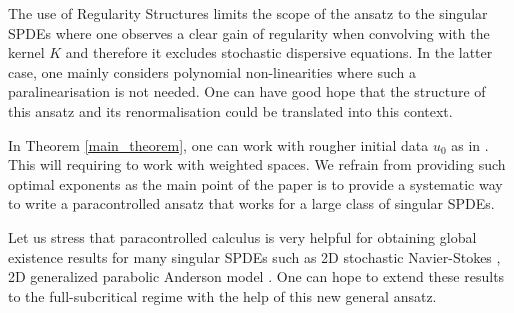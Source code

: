 \documentclass[11pt]{preprint}
\newcounter{theorem}
\begin{document}
	\begin{remark}
		The use of Regularity Structures limits the scope of the ansatz to the singular SPDEs where one observes a clear gain of regularity when convolving with the kernel $K$ and therefore it excludes stochastic dispersive equations. In the latter case, one mainly considers polynomial non-linearities where such a paralinearisation is not needed. One can have good hope that the structure of this ansatz and its renormalisation could be translated into this context.
		\end{remark}
		
		\begin{remark} In Theorem \ref{main_theorem}, one can work with rougher initial data $u_0$ as in \cite{BCCH}. This will requiring to work with weighted spaces. We refrain from providing such optimal exponents as the main point of the paper is to provide a systematic way to write a paracontrolled ansatz that works for a large class of singular SPDEs.
			\end{remark}
			
			\begin{remark}
				Let us stress that paracontrolled calculus is very helpful for obtaining global existence results for many singular SPDEs such as 2D stochastic Navier-Stokes \cite{HR24}, 2D generalized parabolic Anderson model \cite{SZZ26}. One can hope to extend these results to the full-subcritical regime with the help of this new general ansatz.
				\end{remark}
\end{document}
